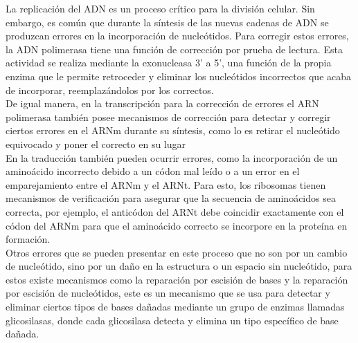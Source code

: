 La replicación del ADN es un proceso crítico para la división celular. Sin embargo, es común que durante la síntesis de las nuevas cadenas de ADN se produzcan errores en la incorporación de nucleótidos. Para corregir estos errores, la ADN polimerasa tiene una función de corrección por prueba de lectura. Esta actividad se realiza mediante la exonucleasa 3' a 5', una función de la propia enzima que le permite retroceder y eliminar los nucleótidos incorrectos que acaba de incorporar, reemplazándolos por los correctos.\\

De igual manera, en la transcripción para la corrección de errores el ARN polimerasa también posee mecanismos de corrección para detectar y corregir ciertos errores en el ARNm durante su síntesis, como lo es retirar el nucleótido equivocado y poner el correcto en su lugar\\

En la traducción también pueden ocurrir errores, como la incorporación de un aminoácido incorrecto debido a un códon mal leído o a un error en el emparejamiento entre el ARNm y el ARNt. Para esto, los ribosomas tienen mecanismos de verificación para asegurar que la secuencia de aminoácidos sea correcta, por ejemplo, el anticódon del ARNt debe coincidir exactamente con el códon del ARNm para que el aminoácido correcto se incorpore en la proteína en formación.\\

Otros errores que se pueden presentar en este proceso que no son por un cambio de nucleótido, sino por un daño en la estructura o un espacio sin nucleótido, para estos existe mecanismos como la reparación por escisión de bases y la reparación por escisión de nucleótidos, este es un mecanismo que se usa para detectar y eliminar ciertos tipos de bases dañadas mediante un grupo de enzimas llamadas glicosilasas, donde cada glicosilasa detecta y elimina un tipo específico de base dañada.\\